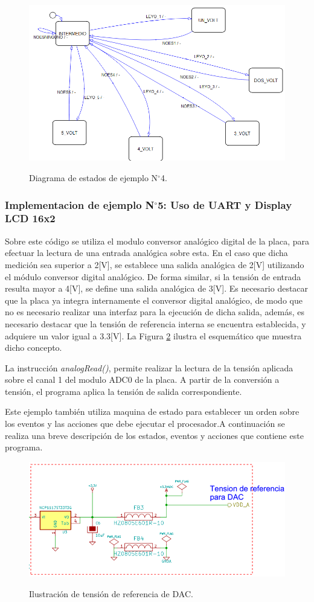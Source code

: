 \documentclass[12pt,letterpaper]{article}
\begin{document}
\begin{center}
\begin{figure}[!h]
\centering
\includegraphics[width=8 cm]{figuras/f7.png}\\
\caption{Diagrama de estados de ejemplo N$^{\circ}$4.}
\label{Fig25}
\end{figure}
\end{center}

\subsubsection{Implementacion de ejemplo N$^{\circ}$5: Uso de UART y Display LCD 16x2}
Sobre este código se utiliza el modulo conversor analógico digital de la placa, para efectuar la lectura de una entrada analógica sobre esta. En el caso que dicha medición sea superior a 2[V], se establece una salida analógica de 2[V] utilizando el módulo conversor digital analógico. De forma similar, si la tensión de entrada resulta mayor a 4[V], se define una salida analógica de 3[V].
Es necesario destacar que la placa ya integra internamente el conversor digital analógico, de modo que no es necesario realizar una interfaz para la ejecución de dicha salida, además, es necesario destacar que la tensión de referencia interna se encuentra establecida, y adquiere un valor igual a 3.3[V]. La Figura \ref{Fig26} ilustra el esquemático que muestra dicho concepto.

La instrucción \textit{analogRead()}, permite realizar la lectura de la tensión aplicada sobre el canal 1 del modulo ADC0 de la placa. A partir de la conversión a tensión, el programa aplica la tensión de salida correspondiente.

Este ejemplo también utiliza maquina de estado para establecer un orden sobre los eventos y las acciones que debe ejecutar el procesador.A continuación se realiza una breve descripción de los estados, eventos y acciones que contiene este programa.

\begin{center}
\begin{figure}[!h]
\centering
\includegraphics[width=8 cm]{figuras/f8.png}\\
\caption{Ilustración de tensión de referencia de DAC.}
\label{Fig26}
\end{figure}
\end{center}
\end{document}
